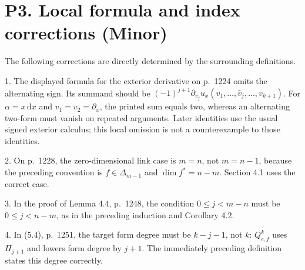 \documentclass[10pt]{article}
\begin{document}
\section*{P3. Local formula and index corrections (Minor)}
The following corrections are directly determined by the surrounding definitions.\par
1. The displayed formula for the exterior derivative on p. 1224 omits the alternating sign. Its summand should be \((-1)^{j+1}\partial_{v_j}u_x(v_1,\ldots,\widehat v_j,\ldots,v_{k+1})\). For \(\alpha=x\,\mathrm dx\) and \(v_1=v_2=\partial_x\), the printed sum equals two, whereas an alternating two-form must vanish on repeated arguments. Later identities use the usual signed exterior calculus; this local omission is not a counterexample to those identities.\par
2. On p. 1228, the zero-dimensional link case is \(m=n\), not \(m=n-1\), because the preceding convention is \(f\in\Delta_{m-1}\) and \(\dim f^*=n-m\). Section 4.1 uses the correct case.\par
3. In the proof of Lemma 4.4, p. 1248, the condition \(0\le j<m-n\) must be \(0\le j<n-m\), as in the preceding induction and Corollary 4.2.\par
4. In (5.4), p. 1251, the target form degree must be \(k-j-1\), not \(k\): \(Q^k_{e,f}\) uses \(\Pi_{j+1}\) and lowers form degree by \(j+1\). The immediately preceding definition states this degree correctly.\par
\end{document}
